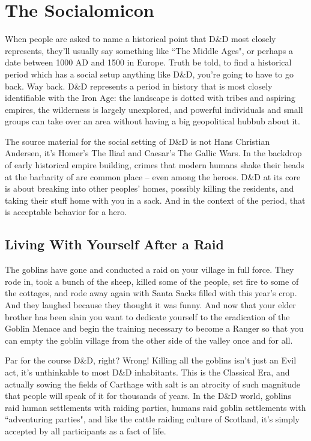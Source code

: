 
\section{The Socialomicon} %
\vspace*{-10pt}

When people are asked to name a historical point that D\&D most closely represents, they'll usually say something like ``The Middle Ages", or perhaps a date between 1000 AD and 1500 in Europe. Truth be told, to find a historical period which has a social setup anything like D\&D, you're going to have to go back. Way back. D\&D represents a period in history that is most closely identifiable with the Iron Age: the landscape is dotted with tribes and aspiring empires, the wilderness is largely unexplored, and powerful individuals and small groups can take over an area without having a big geopolitical hubbub about it.

The source material for the social setting of D\&D is not Hans Christian Andersen, it's Homer's The Iliad and Caesar's The Gallic Wars. In the backdrop of early historical empire building, crimes that modern humans shake their heads at the barbarity of are common place -- even among the heroes. D\&D at its core is about breaking into other peoples' homes, possibly killing the residents, and taking their stuff home with you in a sack. And in the context of the period, that is acceptable behavior for a hero.

\subsection{Living With Yourself After a Raid}

The goblins have gone and conducted a raid on your village in full force. They rode in, took a bunch of the sheep, killed some of the people, set fire to some of the cottages, and rode away again with Santa Sacks filled with this year's crop. And they laughed because they thought it was funny. And now that your elder brother has been slain you want to dedicate yourself to the eradication of the Goblin Menace and begin the training necessary to become a Ranger so that you can empty the goblin village from the other side of the valley once and for all.

Par for the course D\&D, right? Wrong! Killing all the goblins isn't just an Evil act, it's unthinkable to most D\&D inhabitants. This is the Classical Era, and actually sowing the fields of Carthage with salt is an atrocity of such magnitude that people will speak of it for thousands of years. In the D\&D world, goblins raid human settlements with raiding parties, humans raid goblin settlements with ``adventuring parties", and like the cattle raiding culture of Scotland, it's simply accepted by all participants as a fact of life.

